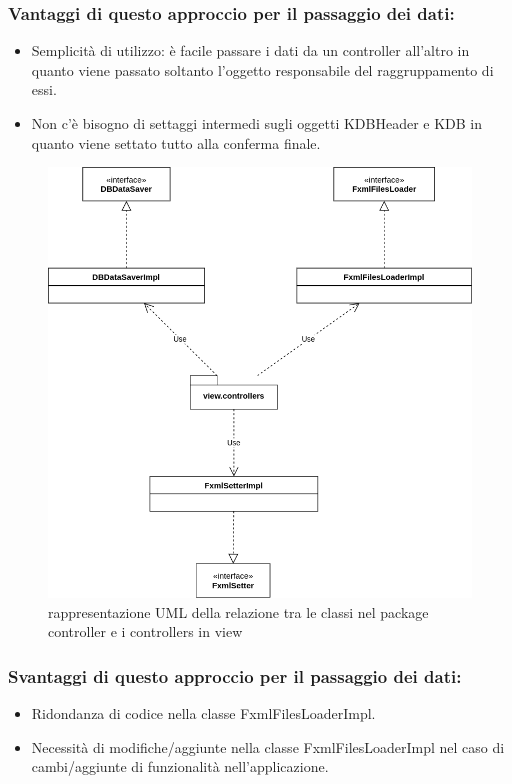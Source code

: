 \documentclass[a4paper,12pt]{report}
\begin{document}
\subsubsection*{Vantaggi di questo approccio per il passaggio dei dati:}
\begin{itemize}
    \item Semplicità di utilizzo: è facile passare i dati da un controller all'altro in quanto viene passato soltanto l'oggetto responsabile del raggruppamento di essi.
    \item Non c'è bisogno di settaggi intermedi sugli oggetti KDBHeader e KDB in quanto viene settato tutto alla conferma finale.
\end{itemize}

\clearpage
\begin{figure}[h]
\centering{}
\includegraphics[width=\textwidth]{controller-pkg-view.png}
\caption{rappresentazione UML della relazione tra le classi nel package controller e i controllers in view}

\end{figure}
\subsubsection*{Svantaggi di questo approccio per il passaggio dei dati:}
\begin{itemize}
    \item Ridondanza di codice nella classe FxmlFilesLoaderImpl.
    \item Necessità di modifiche/aggiunte nella classe FxmlFilesLoaderImpl nel caso di cambi/aggiunte di funzionalità nell'applicazione.
\end{itemize}
\end{document}
